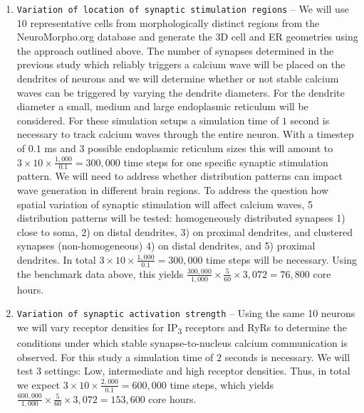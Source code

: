 \begin{enumerate}
\item \texttt{Variation of location of synaptic stimulation regions} -- We will use 10 representative cells from morphologically distinct regions from the NeuroMorpho.org database and generate the 3D cell and ER geometries using the approach outlined above. The number of synapses determined in the previous study which reliably triggers a calcium wave will be placed on the dendrites of neurons and we will determine whether or not stable calcium waves can be triggered by varying the dendrite diameters. For the dendrite diameter a small, medium and large endoplasmic reticulum will be considered.
For these simulation setups a simulation time of $1$ second is necessary to track calcium waves through the entire neuron. With a timestep of $0.1$ ms and 3 possible endoplasmic reticulum sizes this will amount to $3 \times 10 \times \frac{1,000}{0.1} = 300,000$ time steps for one specific synaptic stimulation pattern. We will need to address whether distribution patterns can impact wave generation in different brain regions. To address the question how spatial variation of synaptic stimulation will affect calcium waves, 5 distribution patterns will be tested: homogeneously distributed synapses 1) close to soma, 2) on distal dendrites, 3) on proximal dendrites, and clustered synapses (non-homogeneous) 4) on distal dendrites, and 5) proximal dendrites. In total $3 \times 10 \times \frac{1,000}{0.1} = 300,000$ time steps will be necessary. Using the benchmark data above, this yields $\frac{300,000}{1,000} \times \frac{5}{60} \times 3,072 = 76,800$ core hours.

\item \texttt{Variation of synaptic activation strength} -- Using the same 10 neurons we will vary receptor densities for IP\textsubscript3 receptors and RyRs to determine the conditions under which stable synapse-to-nucleus calcium communication is observed. 
For this study a simulation time of $2$ seconds is necessary. We will test 3 settings: Low, intermediate and high receptor densities. Thus, in total we expect $3 \times 10 \times \frac{2,000}{0.1} = 600,000$ time steps, which yields $\frac{600,000}{1,000} \times \frac{5}{60} \times 3,072 = 153,600$ core hours.
\end{enumerate}

